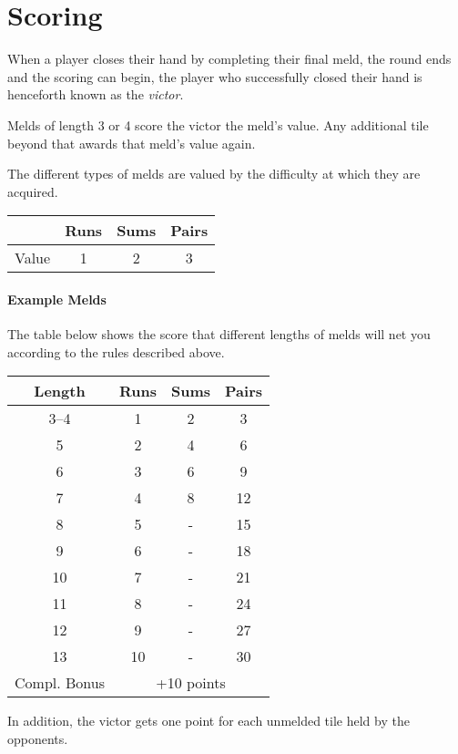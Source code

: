 \section{Scoring}\label{sec:scoring}
When a player closes their hand by completing their final meld, the round ends and the scoring can begin, the player who successfully closed their hand is henceforth known as the \textit{victor}.

Melds of length 3 or 4 score the victor the meld's value. Any additional tile beyond that awards that meld's value again.

The different types of melds are valued by the difficulty at which they are acquired.

\begin{center}
    \begin{tabular}{c||c|c|c}
              & Runs & Sums & Pairs\\\hline\hline
        Value & 1 & 2 & 3\\
    \end{tabular}
\end{center}

\paragraph{Example Melds}
The table below shows the score that different lengths of melds will net you according to the rules described above.
\begin{center}
    \begin{tabular}{c||c|c|c}
        Length & Runs & Sums & Pairs\\\hline\hline
        3--4 & 1 &  2 &  3 \\
           5 & 2 &  4 &  6 \\
           6 & 3 &  6 &  9 \\
           7 & 4 &  8 & 12 \\
           8 & 5 &  - & 15 \\
           9 & 6 &  - & 18 \\
          10 & 7 &  - & 21 \\
          11 & 8 &  - & 24 \\
          12 & 9 &  - & 27 \\
          13 &10 &  - & 30 \\\hline
          Compl. Bonus & \multicolumn{3}{c}{+10 points}
    \end{tabular}
\end{center}
In addition, the victor gets one point for each unmelded tile held by the opponents.

